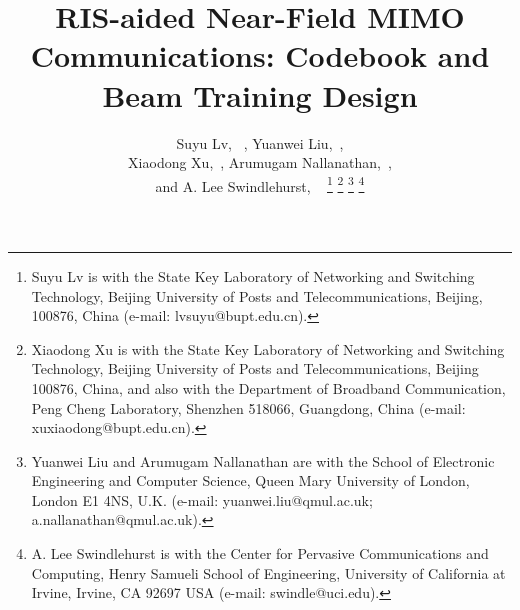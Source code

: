 \documentclass[lettersize, journal]{IEEEtran}
\begin{document}
\title{ RIS-aided Near-Field MIMO Communications: Codebook and Beam Training Design}
\author{Suyu Lv, ~,
	Yuanwei Liu,~, \\
        Xiaodong Xu,~,   
        Arumugam Nallanathan,~,\\
         and A. Lee Swindlehurst, ~
\thanks{Suyu Lv is with the State Key Laboratory of Networking and Switching Technology, Beijing University of Posts and Telecommunications, Beijing, 100876, China (e-mail: lvsuyu@bupt.edu.cn).}
\thanks{Xiaodong Xu is with the State Key Laboratory of Networking and Switching Technology, Beijing University of Posts and Telecommunications, Beijing 100876, China, and also with the Department of Broadband Communication, Peng Cheng Laboratory, Shenzhen 518066, Guangdong, China (e-mail: xuxiaodong@bupt.edu.cn).}
\thanks{Yuanwei Liu and Arumugam Nallanathan are with the School of Electronic Engineering and Computer Science, Queen Mary University of London, London
E1 4NS, U.K. (e-mail: yuanwei.liu@qmul.ac.uk; a.nallanathan@qmul.ac.uk).}
\thanks{A. Lee Swindlehurst is with the Center for Pervasive Communications and Computing, Henry Samueli School of Engineering, University of California at Irvine, Irvine, CA 92697 USA (e-mail: swindle@uci.edu).}
}



\maketitle 
\end{document}
